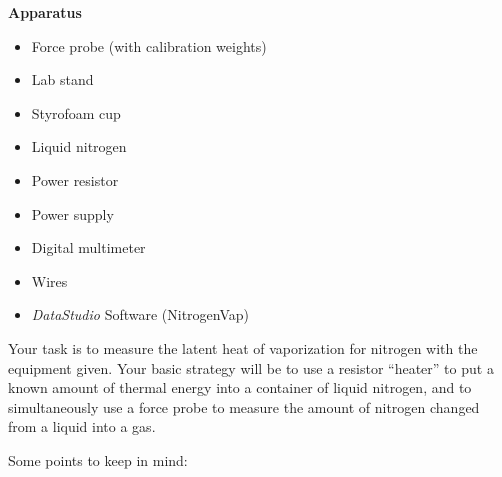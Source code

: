 \textbf{Apparatus}
\begin{itemize}
\item Force probe (with calibration weights)
\item Lab stand
\item Styrofoam cup
\item Liquid nitrogen
\item Power resistor
\item Power supply
\item Digital multimeter
  
\item Wires
\item \textit{DataStudio} Software (NitrogenVap)
\end{itemize}

Your task is to measure the latent heat of vaporization for nitrogen with the equipment given.
Your basic strategy will be to use a resistor ``heater'' to put a known amount of thermal
energy into a container of liquid nitrogen, and to simultaneously use a force probe to
measure the amount of nitrogen changed from a liquid into a gas.

Some points to keep in mind:

